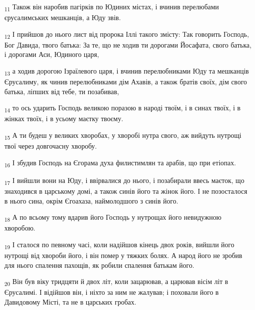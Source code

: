 \begin{tcolorbox}
\textsubscript{11} Також він наробив пагірків по Юдиних містах, і вчинив перелюбами єрусалимських мешканців, а Юду звів.
\end{tcolorbox}
\begin{tcolorbox}
\textsubscript{12} І прийшов до нього лист від пророка Іллі такого змісту: Так говорить Господь, Бог Давида, твого батька: За те, що не ходив ти дорогами Йосафата, свого батька, і дорогами Аси, Юдиного царя,
\end{tcolorbox}
\begin{tcolorbox}
\textsubscript{13} а ходив дорогою Ізраїлевого царя, і вчинив перелюбниками Юду та мешканців Єрусалиму, як чинив перелюбниками дім Ахавів, а також братів своїх, дім свого батька, ліпших від тебе, ти позабивав,
\end{tcolorbox}
\begin{tcolorbox}
\textsubscript{14} то ось ударить Господь великою поразою в народі твоїм, і в синах твоїх, і в жінках твоїх, і в усьому маєтку твоєму.
\end{tcolorbox}
\begin{tcolorbox}
\textsubscript{15} А ти будеш у великих хворобах, у хворобі нутра свого, аж вийдуть нутрощі твої через довгочасну хворобу.
\end{tcolorbox}
\begin{tcolorbox}
\textsubscript{16} І збудив Господь на Єгорама духа филистимлян та арабів, що при етіопах.
\end{tcolorbox}
\begin{tcolorbox}
\textsubscript{17} І вийшли вони на Юду, і ввірвалися до нього, і позабирали ввесь маєток, що знаходився в царському домі, а також синів його та жінок його. І не позосталося в нього сина, окрім Єгоахаза, наймолодшого з синів його.
\end{tcolorbox}
\begin{tcolorbox}
\textsubscript{18} А по всьому тому вдарив його Господь у нутрощах його невидужною хворобою.
\end{tcolorbox}
\begin{tcolorbox}
\textsubscript{19} І сталося по певному часі, коли надійшов кінець двох років, вийшли його нутрощі від хвороби його, і він помер у тяжких болях. А народ його не зробив для нього спалення пахощів, як робили спалення батькам його.
\end{tcolorbox}
\begin{tcolorbox}
\textsubscript{20} Він був віку тридцяти й двох літ, коли зацарював, а царював вісім літ в Єрусалимі. І відійшов він, і ніхто за ним не жалував; і поховали його в Давидовому Місті, та не в царських гробах.
\end{tcolorbox}
